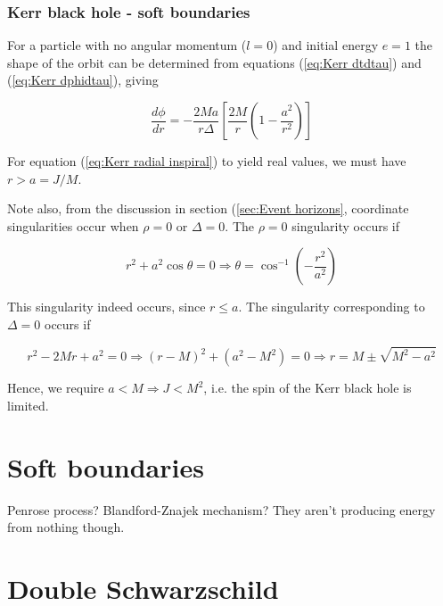\subsubsection{Kerr black hole - soft boundaries}

For a particle with no angular momentum ($l=0$) and initial energy $e=1$ the shape of the orbit can be determined from equations (\ref{eq:Kerr dtdtau}) and (\ref{eq:Kerr dphidtau}), giving

\begin{equation}
    \frac{d\phi}{dr} = -\frac{2 M a}{r \Delta} \left[   \frac{2M}{r} \left(  1-\frac{a^2}{r^2}   \right)    \right]
\end{equation}\label{eq:Kerr radial inspiral}

For equation (\ref{eq:Kerr radial inspiral}) to yield real values, we must have $r>a=J/M$.

Note also, from the discussion in section (\ref{sec:Event horizons}, coordinate singularities occur when $\rho=0$ or $\Delta = 0$. The $\rho=0$ singularity occurs if

\begin{equation}
    r^2+a^2 \cos{\theta} = 0
    \Rightarrow
    \theta=\cos^{-1}{\left(-\frac{r^2}{a^2}\right)}
\end{equation}

This singularity indeed occurs, since $r \leq a$. The singularity corresponding to $\Delta=0$ occurs if

\begin{equation}
    r^2-2Mr+a^2=0
    \Rightarrow
    (r-M)^2+(a^2-M^2)=0
    
    \Rightarrow
    r=M\pm\sqrt{M^2-a^2}\label{eq:Kerr event horizon}
\end{equation}

Hence, we require $a<M\Rightarrow J < M^2$, i.e. the spin of the Kerr black hole is limited.


\section{Soft boundaries}

Penrose process? Blandford-Znajek mechanism? They aren't producing energy from nothing though.



\section{Double Schwarzschild}



